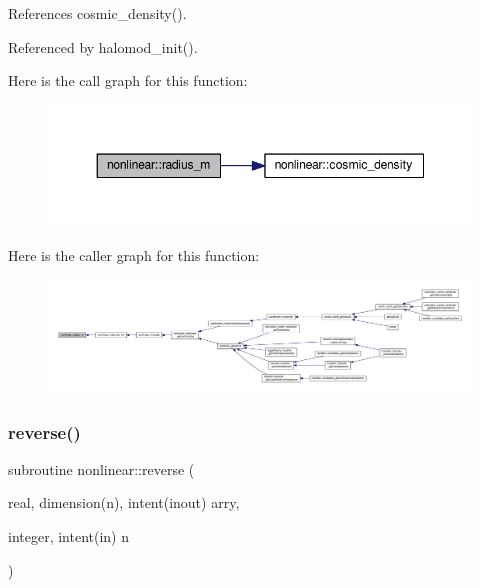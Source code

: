 References cosmic\+\_\+density().



Referenced by halomod\+\_\+init().

Here is the call graph for this function\+:
\nopagebreak
\begin{figure}[H]
\begin{center}
\leavevmode
\includegraphics[width=348pt]{namespacenonlinear_af71d6d6d99de458db1a669744d7b1088_cgraph}
\end{center}
\end{figure}
Here is the caller graph for this function\+:
\nopagebreak
\begin{figure}[H]
\begin{center}
\leavevmode
\includegraphics[width=350pt]{namespacenonlinear_af71d6d6d99de458db1a669744d7b1088_icgraph}
\end{center}
\end{figure}
\mbox{\label{namespacenonlinear_ac344cab10a5226c8ef0147ff8f96767a}} 
\subsubsection{\texorpdfstring{reverse()}{reverse()}}
{\footnotesize\ttfamily subroutine nonlinear\+::reverse (\begin{DoxyParamCaption}\item[{real, dimension(n), intent(inout)}]{arry,  }\item[{integer, intent(in)}]{n }\end{DoxyParamCaption})\hspace{0.3cm}{\ttfamily [private]}}



